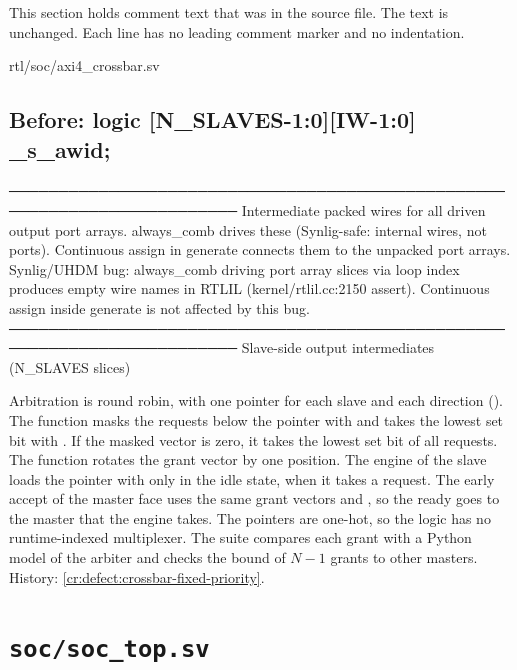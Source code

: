 This section holds comment text that was in the source file. The text is unchanged. Each line has no leading comment marker and no indentation.

\begin{relocated}{rtl/soc/axi4_crossbar.sv}

\subsection*{Before: logic [N\_SLAVES-1:0][IW-1:0]    \_s\_awid;}

\begin{textblock}
─────────────────────────────────────────────────────────────────────────
Intermediate packed wires for all driven output port arrays.
always_comb drives these (Synlig-safe: internal wires, not ports).
Continuous assign in generate connects them to the unpacked port arrays.
Synlig/UHDM bug: always_comb driving port array slices via loop index
produces empty wire names in RTLIL (kernel/rtlil.cc:2150 assert).
Continuous assign inside generate is not affected by this bug.
─────────────────────────────────────────────────────────────────────────
Slave-side output intermediates (N_SLAVES slices)
\end{textblock}

\end{relocated}

\begin{information}
Arbitration is round robin, with one pointer for each slave and each direction (). The function  masks the requests below the pointer with  and takes the lowest set bit with . If the masked vector is zero, it takes the lowest set bit of all requests. The function  rotates the grant vector by one position. The engine of the slave loads the pointer with  only in the idle state, when it takes a request. The early accept of the master face uses the same grant vectors  and , so the ready goes to the master that the engine takes. The pointers are one-hot, so the logic has no runtime-indexed multiplexer. The suite  compares each grant with a Python model of the arbiter and checks the bound of $N-1$ grants to other masters. History: \cref{cr:defect:crossbar-fixed-priority}.
\end{information}

\section{\texttt{soc/soc\_top.sv}}\label{tm:mod:soc-top}

